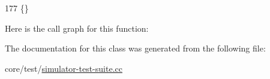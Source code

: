 \begin{DoxyCode}
177 \{\}
\end{DoxyCode}


Here is the call graph for this function\+:




The documentation for this class was generated from the following file\+:\begin{DoxyCompactItemize}
\item 
core/test/\hyperlink{simulator-test-suite_8cc}{simulator-\/test-\/suite.\+cc}\end{DoxyCompactItemize}
